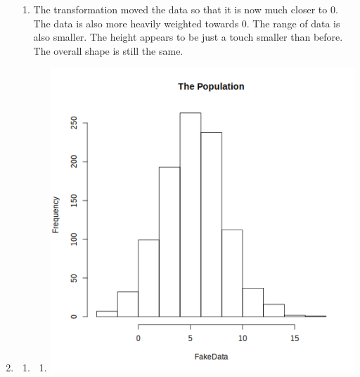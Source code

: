 \documentclass[12pt,letterpaper]{article}
\begin{document}
\begin{enumerate}
\begin{enumerate}
        \item
          The transformation moved the data so that it is now much closer to 0.
          The data is also more heavily weighted towards 0.
          The range of data is also smaller.
          The height appears to be just a touch smaller than before.
          The overall shape is still the same.
      \end{enumerate}
    \item
      \begin{enumerate}
        \item
          \begin{enumerate}
            \item
              \includegraphics[width=\linewidth]{prob3a.png}


\end{enumerate}
\end{enumerate}
\end{enumerate}
\end{document}
